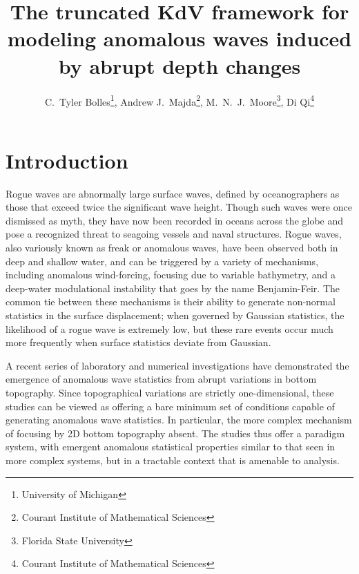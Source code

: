 \documentclass[11pt]{article}
\begin{document}
\title{The truncated KdV framework for modeling anomalous waves induced by abrupt depth changes}

\author{
C.~Tyler Bolles\thanks{University of Michigan},
Andrew J.~Majda\thanks{Courant Institute of Mathematical Sciences}, 
M.~N.~J.~Moore\thanks{Florida State University}, 
Di Qi\thanks{Courant Institute of Mathematical Sciences} }
\maketitle

\section{Introduction}

Rogue waves are abnormally large surface waves, defined by oceanographers as those that exceed twice the significant wave height. Though such waves were once dismissed as myth, they have now been recorded in oceans across the globe and pose a recognized threat to seagoing vessels and naval structures. Rogue waves, also variously known as freak or anomalous waves, have been observed both in deep and shallow water, and can be triggered by a variety of mechanisms, including anomalous wind-forcing, focusing due to variable bathymetry, and a deep-water modulational instability that goes by the name Benjamin-Feir. The common tie between these mechanisms is their ability to generate non-normal statistics in the surface displacement; when governed by Gaussian statistics, the likelihood of a rogue wave is extremely low, but these rare events occur much more frequently when surface statistics deviate from Gaussian. 

A recent series of laboratory \cite{bolles2019anomalous} and numerical investigations \cite{viotti2014} have demonstrated the emergence of anomalous wave statistics from abrupt variations in bottom topography. Since topographical variations are strictly one-dimensional, these studies can be viewed as offering a bare minimum set of conditions capable of generating anomalous wave statistics. In particular, the more complex mechanism of focusing by 2D bottom topography absent. The studies thus offer a paradigm system, with emergent anomalous statistical properties similar to that seen in more complex systems, but in a tractable context that is amenable to analysis.
\end{document}

